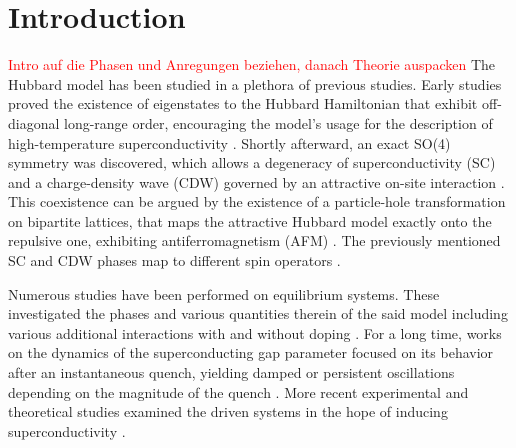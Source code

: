 \documentclass[
    reprint, 
    aps,
    preprintnumbers,
    twocolumn,
    prb,
    superscriptaddress
]{revtex4-2}
\begin{document}

\section{Introduction}\label{sec:introduction}

\textcolor{red}{Intro auf die Phasen und Anregungen beziehen, danach Theorie auspacken}
The Hubbard model has been studied in a plethora of previous studies. 
Early studies proved the existence of eigenstates to the Hubbard Hamiltonian that exhibit off-diagonal long-range order,
encouraging the model's usage for the description of high-temperature superconductivity \cite{yang89}.
Shortly afterward, an exact SO(4) symmetry was discovered,
which allows a degeneracy of superconductivity (SC) and a charge-density wave (CDW) governed by an attractive on-site interaction \cite{yang90}.
This coexistence can be argued by the existence of a particle-hole transformation on bipartite lattices, 
that maps the attractive Hubbard model exactly onto the repulsive one, exhibiting antiferromagnetism (AFM) \cite{Hirsch85}.
The previously mentioned SC and CDW phases map to different spin operators \cite{zitko15,lieb89}.

Numerous studies have been performed on equilibrium systems. 
These investigated the phases and various quantities therein of the said model including various additional interactions with and without doping 
\cite{Micnas88,Micnas88b,Micnas89,Dzierzawa92,Kostyrko92,Eriksson95,Staudt00,Onari04,Toschi05,Brackett16,Paki19,romer20,Sushchyev22}.
For a long time, works on the dynamics of the superconducting gap parameter focused on its behavior after an instantaneous quench, 
yielding damped or persistent oscillations depending on the magnitude of the quench \cite{Volkov73,Yuzbashyan05,Yuzbashyan06,Barankov06,Cui19}.
More recent experimental and theoretical studies examined the driven systems in the hope of inducing superconductivity \cite{Nicoletti14,Krull14,Moor14,Casandruc15,patel16,sentef17,Buenemann17}.
\end{document}
